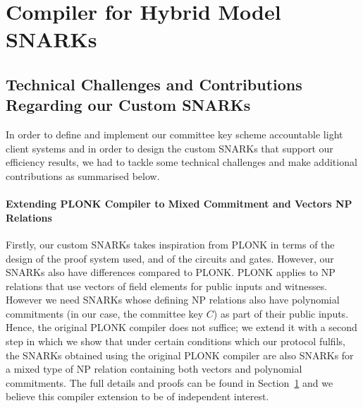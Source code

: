 \section{Compiler for Hybrid Model SNARKs}
\label{sec_two_step_compiler}
\subsection{Technical Challenges and Contributions Regarding our Custom SNARKs} 
\label{sec:technical_challenges}

In order to define and implement our committee key scheme accountable light client systems and in order to design the custom SNARKs that support our efficiency results, 
we had to tackle some technical challenges and make additional contributions as summarised below.

\paragraph{Extending PLONK Compiler to Mixed Commitment and Vectors NP Relations} Firstly, our custom SNARKs takes inspiration from PLONK \cite{plonk} in terms of the design of the proof system used, and of the circuits and gates. However, our SNARKs also have differences compared to PLONK. PLONK applies to NP relations  that use  vectors of field elements for 
public inputs and witnesses.  However we need SNARKs whose defining NP relations also have  polynomial commitments (in our case, the committee key $C$) as part of their public inputs. Hence, the original PLONK compiler does not suffice; we extend it with a second step in which we show that under certain conditions which our protocol fulfils, the SNARKs obtained using the original PLONK compiler are also SNARKs for a mixed type of NP relation containing both vectors and polynomial commitments. The full details and proofs can be found in Section~\ref{sec_two_step_compiler} 
and we believe this compiler extension to be of independent interest. 

